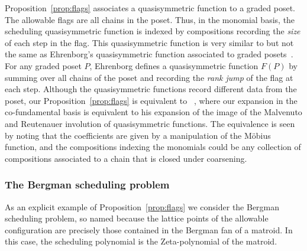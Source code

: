 \documentclass[12pt,reqno]{amsart}
\numberwithin{definition}{section}
\theoremstyle{definition}
\begin{document}
Proposition~\ref{prop:flags} associates a quasisymmetric function to a
graded poset.  The allowable flags are all chains in the poset.  Thus,
in the monomial basis, the scheduling quasisymmetric function is indexed
by compositions recording the \emph{size} of each step in the flag.  This
quasisymmetric function is very similar to but not the same as
Ehrenborg's quasisymmetric function associated to graded
posets~\cite{Ehrenborg}.  For any graded poset $P$, Ehrenborg defines
a quasisymmetric function $F(P)$ by summing over all chains of the
poset and recording the \emph{rank jump} of the flag at each step.  Although
the quasisymmetric functions record different data from the poset, our
Proposition~\ref{prop:flags} is equivalent to
~\cite[Proposition~5.1]{Ehrenborg}, where our expansion in the
co-fundamental basis is equivalent to his expansion of the image of
the Malvenuto and Reutenauer involution of quasisymmetric functions.
The equivalence is seen by noting that the coefficients are given by a
manipulation of the M\"obius function, and the compositions indexing the
monomials could be any collection of compositions associated to a
chain that is closed under coarsening.




\subsubsection{The Bergman scheduling problem} As an explicit example of Proposition~\ref{prop:flags} we consider the Bergman
scheduling problem, so named because the lattice points of the
allowable configuration are precisely those contained in the Bergman
fan of a matroid. In this case, the scheduling polynomial is the
Zeta-polynomial of the matroid.
\end{document}
